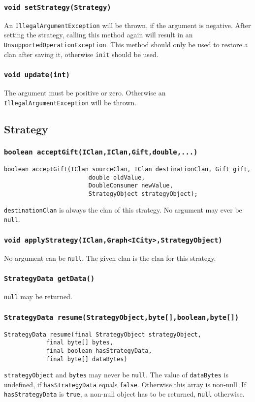\documentclass{article}
\begin{document}
\subsubsection{\texttt{void setStrategy(Strategy)}}
An \texttt{IllegalArgumentException} will be thrown, if the argument is negative.
After setting the strategy, calling this method again will result in an \texttt{UnsupportedOperationException}.
This method should only be used to restore a clan after saving it, otherwise \texttt{init} should be used.

\subsubsection{\texttt{void update(int)}}
The argument must be positive or zero. Otherwise an \texttt{IllegalArgumentException} will be thrown.

\subsection{Strategy}

\subsubsection{\texttt{boolean acceptGift(IClan,IClan,Gift,double,...)}}
\begin{verbatim}
boolean acceptGift(IClan sourceClan, IClan destinationClan, Gift gift,
                        double oldValue,
                        DoubleConsumer newValue,
                        StrategyObject strategyObject);
\end{verbatim}
\texttt{destinationClan} is always the clan of this strategy. No argument may ever be \texttt{null}.

\subsubsection{\texttt{void applyStrategy(IClan,Graph<ICity>,StrategyObject)}}
No argument can be \texttt{null}. The given clan is the clan for this strategy.

\subsubsection{\texttt{StrategyData getData()}}
\texttt{null} may be returned.

\subsubsection{\texttt{StrategyData resume(StrategyObject,byte[],boolean,byte[])}}
\begin{verbatim}
StrategyData resume(final StrategyObject strategyObject,
			final byte[] bytes,
			final boolean hasStrategyData,
			final byte[] dataBytes)
\end{verbatim}
\texttt{strategyObject} and \texttt{bytes} may never be \texttt{null}.
The value of \texttt{dataBytes} is undefined, if \texttt{hasStrategyData} equals \texttt{false}.
Otherwise this array is non-null.
If \texttt{hasStrategyData} is \texttt{true}, a non-null object has to be returned, \texttt{null} otherwise.
\end{document}
